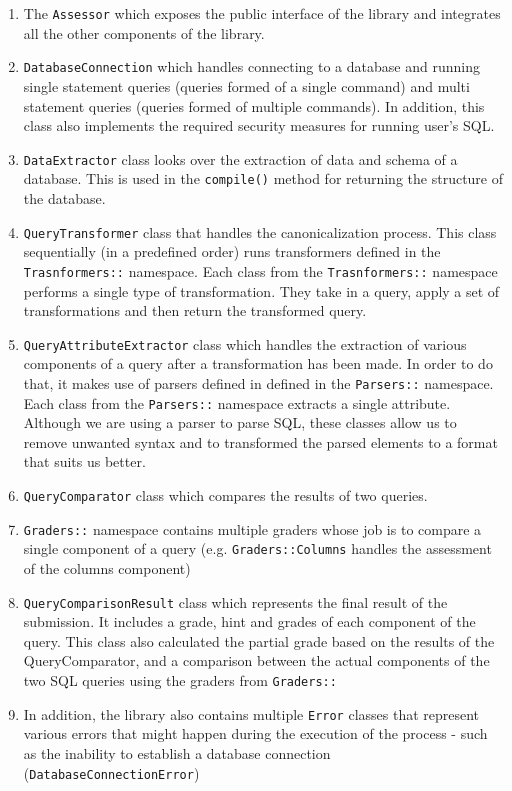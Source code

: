 \begin{enumerate}
    \item The \texttt{Assessor} which exposes the public interface of the library and integrates all the other components of the library.
    \item \texttt{DatabaseConnection} which handles connecting to a database and running single statement queries (queries formed of a single command) and multi statement queries (queries formed of multiple commands). In addition, this class also implements the required security measures for running user's SQL.
    \item \texttt{DataExtractor} class looks over the extraction of data and schema of a database. This is used in the \texttt{compile()} method for returning the structure of the database.
    \item \texttt{QueryTransformer} class that handles the canonicalization process. This class sequentially (in a predefined order) runs transformers defined in the \texttt{Trasnformers::} namespace. Each class from the \texttt{Trasnformers::} namespace performs a single type of transformation. They take in a query, apply a set of transformations and then return the transformed query.
    \item \texttt{QueryAttributeExtractor} class which handles the extraction of various components of a query after a transformation has been made. In order to do that, it makes use of parsers defined in defined in the \texttt{Parsers::} namespace. Each class from the \texttt{Parsers::} namespace extracts a single attribute. Although we are using a parser to parse SQL, these classes allow us to remove unwanted syntax and to transformed the parsed elements to a format that suits us better.
    \item \texttt{QueryComparator} class which compares the results of two queries.
    \item \texttt{Graders::} namespace contains multiple graders whose job is to compare a single component of a query (e.g. \texttt{Graders::Columns} handles the assessment of the columns component)
    \item \texttt{QueryComparisonResult} class which represents the final result of the submission. It includes a grade, hint and grades of each component of the query. This class also calculated the partial grade based on the results of the QueryComparator, and a comparison between the actual components of the two SQL queries using the graders from \texttt{Graders::}
    \item In addition, the library also contains multiple \texttt{Error} classes that represent various errors that might happen during the execution of the process - such as the inability to establish a database connection (\texttt{DatabaseConnectionError})
\end{enumerate}

